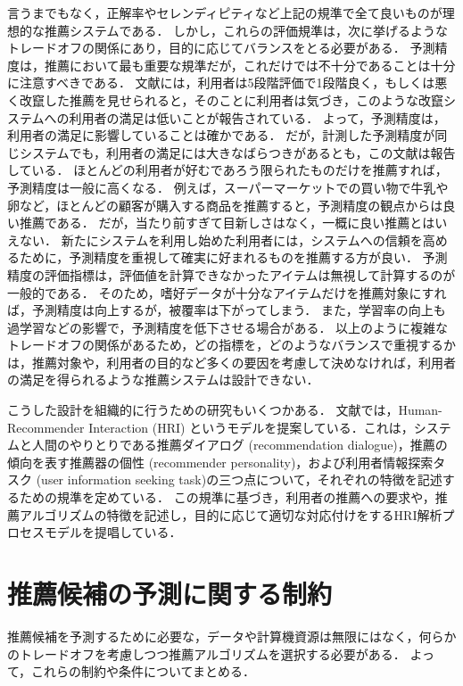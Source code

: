 言うまでもなく，正解率やセレンディピティなど上記の規準で全て良いものが理想的な推薦システムである．
しかし，これらの評価規準は，次に挙げるようなトレードオフの関係にあり，目的に応じてバランスをとる必要がある．
予測精度は，推薦において最も重要な規準だが，これだけでは不十分であることは十分に注意すべきである．
文献\cite{sigchi:03:02}には，利用者は5段階評価で1段階良く，もしくは悪く改竄した推薦を見せられると，そのことに利用者は気づき，このような改竄システムへの利用者の満足は低いことが報告されている．
よって，予測精度は，利用者の満足に影響していることは確かである．
だが，計測した予測精度が同じシステムでも，利用者の満足には大きなばらつきがあるとも，この文献は報告している．
ほとんどの利用者が好むであろう限られたものだけを推薦すれば，予測精度は一般に高くなる．
例えば，スーパーマーケットでの買い物で牛乳や卵など，ほとんどの顧客が購入する商品を推薦すると，予測精度の観点からは良い推薦である．
だが，当たり前すぎて目新しさはなく，一概に良い推薦とはいえない．
新たにシステムを利用し始めた利用者には，システムへの信頼を高めるために，予測精度を重視して確実に好まれるものを推薦する方が良い．
予測精度の評価指標は，評価値を計算できなかったアイテムは無視して計算するのが一般的である．
そのため，嗜好データが十分なアイテムだけを推薦対象にすれば，予測精度は向上するが，被覆率は下がってしまう．
また，学習率の向上も過学習などの影響で，予測精度を低下させる場合がある．
以上のように複雑なトレードオフの関係があるため，どの指標を，どのようなバランスで重視するかは，推薦対象や，利用者の目的など多くの要因を考慮して決めなければ，利用者の満足を得られるような推薦システムは設計できない\cite{sigchi:06:01}．

こうした設計を組織的に行うための研究もいくつかある．
文献\cite{sigchi:06:02}では，Human-Recommender Interaction (HRI) というモデルを提案している．これは，システムと人間のやりとりである推薦ダイアログ (recommendation dialogue)，推薦の傾向を表す推薦器の個性 (recommender personality)，および利用者情報探索タスク (user information seeking task)の三つ点について，それぞれの特徴を記述するための規準を定めている．
この規準に基づき，利用者の推薦への要求や，推薦アルゴリズムの特徴を記述し，目的に応じて適切な対応付けをするHRI解析プロセスモデルを提唱している．

\section{推薦候補の予測に関する制約}
\label{sec:rsyslimit}

推薦候補を予測するために必要な，データや計算機資源は無限にはなく，何らかのトレードオフを考慮しつつ推薦アルゴリズムを選択する必要がある．
よって，これらの制約や条件についてまとめる．

